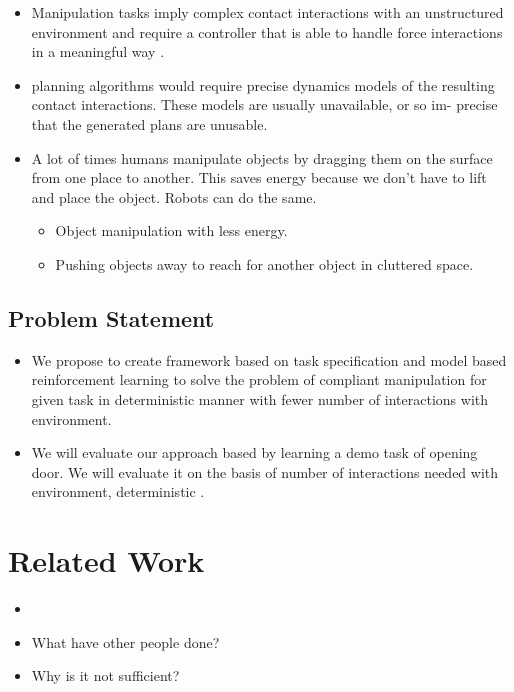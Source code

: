 \documentclass[thesis]{mas_proposal}
\begin{document}
\begin{itemize}
    \item Manipulation tasks imply complex contact interactions with an unstructured environment and require a controller that is able to handle force interactions in a meaningful way \cite{kalakrishnan2011learning}.
    \item planning algorithms would require precise dynamics models of the resulting contact interactions. These models are usually unavailable, or so im- precise that the generated plans are unusable\cite{kalakrishnan2011learning}.
    \item A lot of times humans manipulate objects by dragging them on the surface from one place to another. This saves energy because we don't have to lift and place the object. Robots can do the same. 
    \begin{itemize}
    	\item Object manipulation with less energy.
    	\item Pushing objects away to reach for another object in cluttered space.
    \end{itemize}
\end{itemize}

\section{Problem Statement}
\begin{itemize}
    \item We propose to create framework based on task specification and model based reinforcement learning to solve the problem of compliant manipulation for given task in deterministic manner with fewer number of interactions with environment.
    \item We will evaluate our approach based by learning a demo task of opening door. We will evaluate it on the basis of number of interactions needed with environment, deterministic .
\end{itemize}


\chapter{Related Work}



\begin{itemize}
	\item 
    \item What have other people done?
    \item Why is it not sufficient?
\end{itemize}
\end{document}

